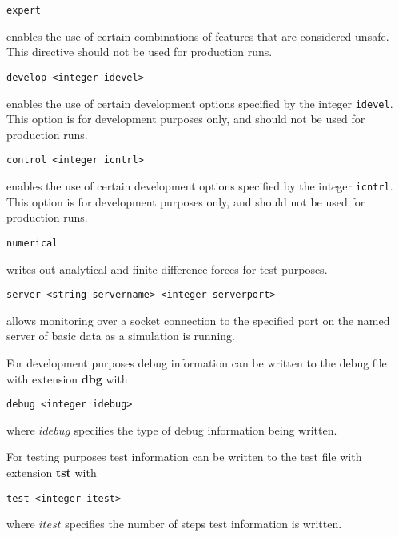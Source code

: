 \begin{description}
\item
\begin{verbatim}
expert
\end{verbatim}
enables the use of certain combinations of features that are considered
unsafe. This directive should not be used for production runs.

\item
\begin{verbatim}
develop <integer idevel>
\end{verbatim}
enables the use of certain development options specified by the
integer \verb+idevel+. This option is for development purposes only,
and should not be used for production runs.

\item
\begin{verbatim}
control <integer icntrl>
\end{verbatim}
enables the use of certain development options specified by the
integer \verb+icntrl+. This option is for development purposes only,
and should not be used for production runs.

\item
\begin{verbatim}
numerical
\end{verbatim}
writes out analytical and finite difference forces for test purposes.

\item
\begin{verbatim}
server <string servername> <integer serverport>
\end{verbatim}
allows monitoring over a socket connection to the specified port on the
named server of basic data as a simulation is running.

\item
For development purposes debug information can be written to the debug
file with extension {\bf dbg} with
\begin{verbatim}
debug <integer idebug>
\end{verbatim}
where $idebug$ specifies the type of debug information being written.

\item
For testing purposes test information can be written to the test
file with extension {\bf tst} with
\begin{verbatim}
test <integer itest>
\end{verbatim}
where $itest$ specifies the number of steps test information is written.

\end{description}
